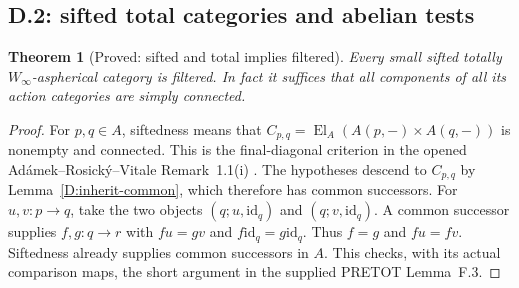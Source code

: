 \documentclass[11pt,a4paper]{article}
\newcommand{\Winfty}{W_\infty}
\newcommand{\El}{\operatorname{El}}
\newcommand{\id}{\mathrm{id}}
\newtheorem{theorem}{Theorem}[section]
\theoremstyle{definition}
\begin{document}
\subsection{D.2: sifted total categories and abelian tests}
\begin{theorem}[Proved: sifted and total implies filtered]\label{D:sifted-total}
Every small sifted totally $\Winfty$-aspherical category is filtered.
In fact it suffices that all components of all its action categories
are simply connected.
\end{theorem}
\begin{proof}
For $p,q\in A$, siftedness means that
$C_{p,q}=\El_A(A(p,-)\times A(q,-))$ is nonempty and connected.
This is the final-diagonal criterion in the opened
Ad\'amek--Rosick\'y--Vitale Remark~1.1(i) \citep{AdamekRosickyVitale2010}. The hypotheses descend
to $C_{p,q}$ by Lemma~\ref{D:inherit-common}, which therefore has
common successors. For $u,v:p\to q$, take the two objects
$(q;u,\id_q)$ and $(q;v,\id_q)$. A common successor supplies
$f,g:q\to r$ with $fu=gv$ and $f\id_q=g\id_q$. Thus $f=g$ and
$fu=fv$. Siftedness already supplies common successors in $A$.
This checks, with its actual comparison maps, the short argument
in the supplied PRETOT Lemma~F.3.
\end{proof}
\end{document}
